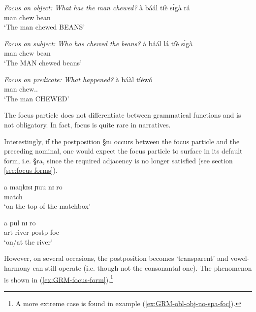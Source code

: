 \begin{exe}
\ex\label{ex:GRM-focus}
\begin{xlist}
 \ex\label{ex:GRM-focus-obj}{\it Focus on object: What has the man chewed?}
\gll   à báál tíè sɪ́gà rá\\
      {\art} man chew bean {\foc} \\
\glt `The man chewed BEANS'

\ex\label{ex:GRM-focus-subj}{\it Focus on subject: Who has chewed the beans?}
\gll   à báál lá   tíè sɪ́gà   \\
       {\art} man {\foc} chew bean    \\
\glt `The MAN chewed beans'

\ex\label{ex:GRM-focus-pred}{\it Focus on predicate: What happened?}
\gll    à báàl tíéwó  \\
   {\art} man chew.{\pfv .\foc}    \\
\glt `The man CHEWED'

\end{xlist}
\end{exe}

The focus particle does not differentiate between  grammatical functions and
is not obligatory. In fact, focus is quite rare in narratives.  

Interestingly, if the postposition {\S nɪ} occurs between the focus particle and
the preceding nominal, one would expect  the focus particle to surface in its
default form, i.e. {\S ra},  since the required adjacency is no longer satisfied
(see  section  \ref{sec:focus-forms}). 


\begin{exe}
\ex\label{ex:GRM-focus-form}
\begin{xlist}
\ex\label{ex:GRM-foc-form-X}
 
\ex\label{ex:GRM-foc-form-1}
\gll  a maŋkɪsɪ ɲuu nɪ ro \\
       {\art} {match} {\reln} {\postp} {\foc}\\
\glt `on the top of the matchbox'

\ex\label{ex:GRM-foc-form-2}
\gll  a  pul nɪ ro \\
       {\sc art} {river} {\sc postp}  {\sc foc}\\
\glt `on/at the river'
\end{xlist}
\end{exe}

However, on several occasions, the postposition becomes `transparent' and 
vowel-harmony can still operate (i.e. though not the consonantal one). The
phenomenon is shown in (\ref{ex:GRM-focus-form}).\footnote{A more extreme case
is found in example (\ref{ex:GRM-obl-obj-no-spa-foc}).}


